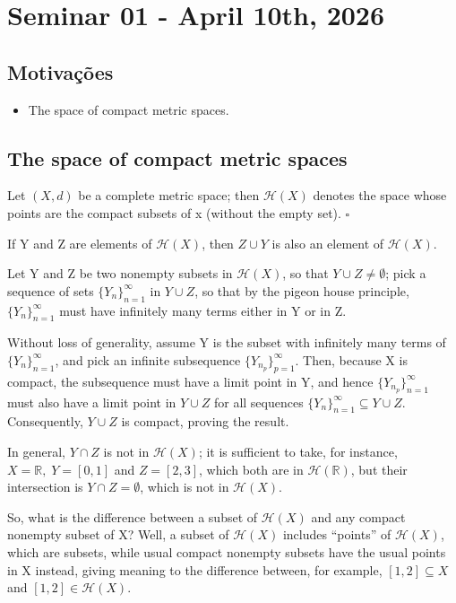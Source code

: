 \documentclass[../fractals_everywhere.tex]{subfiles}
\begin{document}
\section{Seminar 01 - April 10th, 2026}
\subsection{Motivações}
\begin{itemize}
	\item The space of compact metric spaces.
\end{itemize}
\subsection{The space of compact metric spaces}
\begin{def*}
	Let \((X, d)\) be a complete metric space; then \(\mathcal{H}(X)\) denotes the space whose points are the compact subsets of x (without the empty set). \(\square\)
\end{def*}
\begin{prop*}
	If Y and Z are elements of \(\mathcal{H}(X)\), then \(Z \cup Y\) is also an element of \(\mathcal{H}(X)\).
\end{prop*}
\begin{proof*}
	Let Y and Z be two nonempty subsets in \(\mathcal{H}(X)\), so that \(Y\cup Z \neq \emptyset \); pick a sequence of sets \(\{Y_{n}\}_{n=1}^{\infty}\) in \(Y\cup Z\), so that by the pigeon house principle, \(\{Y_{n}\}_{n=1}^{\infty}\) must have infinitely many terms either in Y or in Z.

	Without loss of generality, assume Y is the subset with infinitely many terms of \(\{Y_{n}\}_{n=1}^{\infty}\), and pick an infinite subsequence \(\{Y_{n_{p}}\}_{p=1}^{\infty}\). Then, because X is compact, the subsequence must have a limit point in Y, and hence \(\{Y_{n_{p}}\}_{n=1}^{\infty}\) must also have a limit point in \(Y\cup Z\) for all sequences \(\{Y_{n}\}_{n=1}^{\infty}\subseteq Y\cup Z\). Consequently,
	\(Y\cup Z\) is compact, proving the result. \qedsymbol
\end{proof*}
In general, \(Y\cap Z\) is not in \(\mathcal{H}(X)\); it is sufficient to take, for instance, \(X = \mathbb{R},\; Y = [0, 1]\) and \(Z = [2, 3]\), which both are in \(\mathcal{H}(\mathbb{R})\), but their intersection is \(Y\cap Z = \emptyset \), which is not in \(\mathcal{H}(X)\).

So, what is the difference between a subset of \(\mathcal{H}(X)\) and any compact nonempty subset of X? Well, a subset of \(\mathcal{H}(X)\) includes ``points'' of \(\mathcal{H}(X)\), which are subsets, while usual compact nonempty subsets have the usual points in X instead, giving meaning to the difference between, for example, \([1, 2]\subseteq X\) and \([1, 2]\in \mathcal{H}(X)\).
\end{document}
